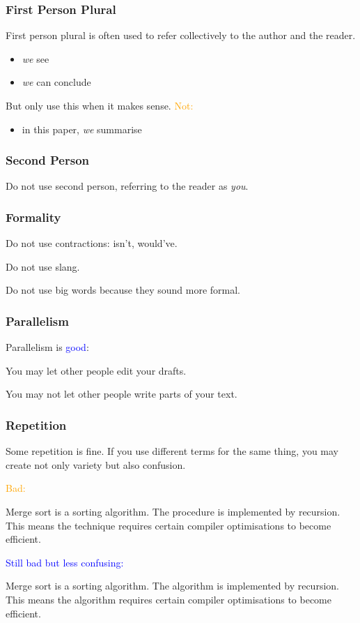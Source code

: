 \documentclass[xetex]{beamer}
\newcommand{\bad}[1]{\textcolor{orange}{#1}}
\newcommand{\good}[1]{\textcolor{blue}{#1}}
\begin{document}
\begin{frame}
  \frametitle{First Person Plural}

  First person plural is often used to refer collectively to the author and the reader.
  \begin{itemize}
    \item \emph{we} see
    \item \emph{we} can conclude
  \end{itemize}

  \medskip
  \pause

  But only use this when it makes sense. \bad{Not:}
  \begin{itemize}
    \item in this paper, \emph{we} summarise
  \end{itemize}
\end{frame}

\begin{frame}
  \frametitle{Second Person}

  Do not use second person, referring to the reader as \emph{you}.
\end{frame}

\begin{frame}
  \frametitle{Formality}

  Do not use contractions: isn't, would've.

  \medskip

  Do not use slang.

  \medskip

  Do not use big words because they sound more formal.
\end{frame}

\begin{frame}
  \frametitle{Parallelism}

  Parallelism is \good{good}:

  \medskip
  \pause

  You may let other people edit your drafts.

  You may not let other people write parts of your text.
\end{frame}

\begin{frame}
  \frametitle{Repetition}

  Some repetition is fine.
  If you use different terms for the same thing, you may create not only variety but also confusion.

  \medskip
  \pause

  \bad{Bad:}

  {
    \small
    Merge sort is a sorting algorithm.
    The procedure is implemented by recursion.
    This means the technique requires certain compiler optimisations to become efficient.
  }

  \medskip
  \pause

  \good{Still bad but less confusing:}

  {
    \small
    Merge sort is a sorting algorithm.
    The algorithm is implemented by recursion.
    This means the algorithm requires certain compiler optimisations to become efficient.
  }
\end{frame}
\end{document}
